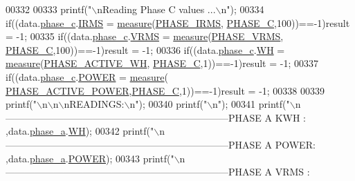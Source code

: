 \begin{DoxyCode}
{{{{{{00332          
00333          printf(\textcolor{stringliteral}{"\(\backslash\)nReading Phase C values ...\(\backslash\)n"});  
00334          \textcolor{keywordflow}{if}((data.\hyperlink{a00029_ad8892f27909cf51f7603adfc00d224df}{phase\_c}.\hyperlink{a00030_a4f87f30b543e89e2e5dfa1b8f3f58eff}{IRMS}           = \hyperlink{a00009_gac914ebaa64afce03ee852af09659cf69}{measure}(\hyperlink{a00043_a15c9ccf287820001431c33c4bb25a23b}{PHASE\_IRMS},
      \hyperlink{a00043_a3ceb83fb10c2af19b468d508448f24e2}{PHASE\_C},100))==-1)result = -1;
00335          \textcolor{keywordflow}{if}((data.\hyperlink{a00029_ad8892f27909cf51f7603adfc00d224df}{phase\_c}.\hyperlink{a00030_a08415029e214174a01bc6487ff98ee9b}{VRMS}           = \hyperlink{a00009_gac914ebaa64afce03ee852af09659cf69}{measure}(\hyperlink{a00043_af0c09c5a455410e6fbd35fd55221338f}{PHASE\_VRMS},
      \hyperlink{a00043_a3ceb83fb10c2af19b468d508448f24e2}{PHASE\_C},100))==-1)result = -1;
00336          \textcolor{keywordflow}{if}((data.\hyperlink{a00029_ad8892f27909cf51f7603adfc00d224df}{phase\_c}.\hyperlink{a00030_a8dd6d8406db4e214238b3eff481e4ea0}{WH}           = \hyperlink{a00009_gac914ebaa64afce03ee852af09659cf69}{measure}(\hyperlink{a00043_a4ee773ad07fa969b9990f9bb3a1a2093}{PHASE\_ACTIVE\_WH},
      \hyperlink{a00043_a3ceb83fb10c2af19b468d508448f24e2}{PHASE\_C},1))==-1)result = -1;
00337          \textcolor{keywordflow}{if}((data.\hyperlink{a00029_ad8892f27909cf51f7603adfc00d224df}{phase\_c}.\hyperlink{a00030_a8a9794fa4c6a69b457d1eb04b017ef1e}{POWER}         = \hyperlink{a00009_gac914ebaa64afce03ee852af09659cf69}{measure}(
      \hyperlink{a00043_abd3f95c7cd63d0627552d293bf49e026}{PHASE\_ACTIVE\_POWER},\hyperlink{a00043_a3ceb83fb10c2af19b468d508448f24e2}{PHASE\_C},1))==-1)result = -1;
00338          
00339         printf(\textcolor{stringliteral}{"\(\backslash\)n\(\backslash\)n\(\backslash\)nREADINGS:\(\backslash\)n"});
00340         printf(\textcolor{stringliteral}{"\(\backslash\)n"});       
00341         printf(\textcolor{stringliteral}{"\(\backslash\)n---------------------------------------------------------------------PHASE A KWH  : %
      ,data.\hyperlink{a00029_ad7205e9853a503d2fab0697f5a301f6c}{phase\_a}.\hyperlink{a00030_a8dd6d8406db4e214238b3eff481e4ea0}{WH});
00342         printf(\textcolor{stringliteral}{"\(\backslash\)n---------------------------------------------------------------------PHASE A POWER: %
      ,data.\hyperlink{a00029_ad7205e9853a503d2fab0697f5a301f6c}{phase\_a}.\hyperlink{a00030_a8a9794fa4c6a69b457d1eb04b017ef1e}{POWER});
00343         printf(\textcolor{stringliteral}{"\(\backslash\)n---------------------------------------------------------------------PHASE A VRMS : %
}}}}}}}}}
\end{DoxyCode}
